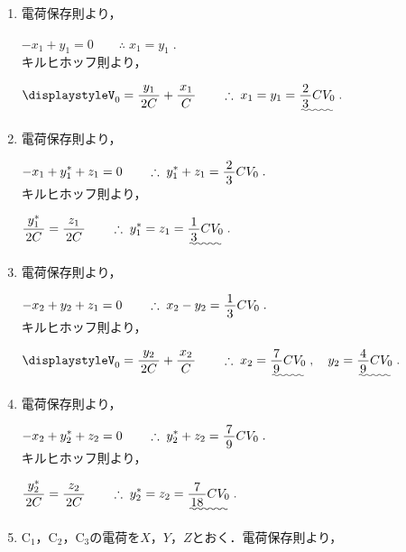 ﻿\documentclass[../../../ps_a.tex]{subfiles}
\begin{document}
    \begin{enumerate}
        \item 電荷保存則より，

            \myspaceb%
            $\displaystyle%
                -x_1 + y_1 = 0 \qquad \therefore \; x_1 = y_1 \;. 
            $\\
            キルヒホッフ則より，
            
            \myspaceb%
            $\displaystyle%
                V_0 = \myfracc{y_1}{2C} +  \myfracc{x_1}{C}%
                \qquad \therefore \; x_1 = y_1 = \uwave{\myfraca{2}{3} CV_0} \;.
            $
        \item 電荷保存則より，
            
            \myspaceb%
            $\displaystyle%
                -x_1 + y^*_1 + z_1 = 0%
                \qquad \therefore \; y^*_1 + z_1 = \myfraca{2}{3} CV_0 \;.
            $\\
            キルヒホッフ則より，
            
            \myspaceb%
            $\displaystyle%
                \myfracc{y^*_1}{2C} = \myfracc{z_1}{2C}%
                \qquad \therefore \; y^*_1 = z_1 = \uwave{\myfraca{1}{3} CV_0} \;.
            $
        \item 電荷保存則より，
            
            \myspaceb%
            $\displaystyle%
                -x_2 + y_2 + z_1 = 0%
                \qquad \therefore \; x_2 - y_2 = \myfraca{1}{3} CV_0 \;.
            $\\
            キルヒホッフ則より，
            
            \myspaceb%
            $\displaystyle%
                V_0 = \myfracc{y_2}{2C} +  \myfracc{x_2}{C}%
                \qquad \therefore \; x_2 = \uwave{\myfraca{7}{9} CV_0} \;,%
                \quad y_2 = \uwave{\myfraca{4}{9} CV_0} \;.
            $
        \item 電荷保存則より，
            
            \myspaceb%
            $\displaystyle%
                -x_2 + y^*_2 + z_2 = 0%
                \qquad \therefore \; y^*_2 + z_2 = \myfraca{7}{9} CV_0 \;.
            $\\
            キルヒホッフ則より，
            
            \myspaceb%
            $\displaystyle%
                \myfracc{y^*_2}{2C} = \myfracc{z_2}{2C}%
                \qquad \therefore \; y^*_2 = z_2 = \uwave{\myfraca{7}{18} CV_0} \;.
            $
        \item C$_1$，C$_2$，C$_3$の電荷を$X$，$Y$，$Z$とおく．電荷保存則より，
            

\end{enumerate}
\end{document}
